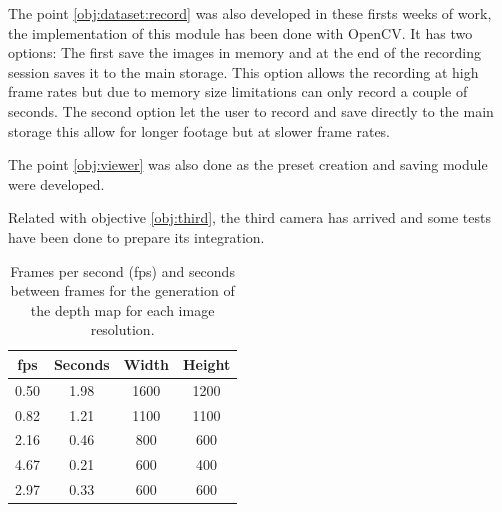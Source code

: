 \documentclass[10pt,a4paper,twocolumn,twoside]{article}
\begin{document}
	The point \ref{obj:dataset:record} was also developed in these firsts weeks of work, the implementation of this module has been done with OpenCV. It has two options:
	The first save the images in memory and at the end of the recording session saves it to the main storage. This option allows the recording at high frame rates but due to memory size limitations can only record a couple of seconds. 
	The second option let the user to record and save directly to the main storage this allow for longer footage but at slower frame rates.
	
	The point \ref{obj:viewer} was also done as the preset creation and saving module were developed.
	
	Related with objective \ref{obj:third}, the third camera has arrived and some tests have been done to prepare its integration.
	
	\begin{table}
		\begin{center}
			\begin{tabular}{cccc}
				\toprule
				fps & Seconds & Width & Height \\ 
				\midrule
				0.50 & 1.98 & 1600 & 1200 \\ 
				
				0.82 & 1.21 & 1100 & 1100 \\ 
				
				2.16 & 0.46 & 800 & 600 \\ 
				
				4.67 & 0.21 & 600 & 400 \\ 
				
				2.97 & 0.33 & 600 & 600 \\ 
				\bottomrule
				
			\end{tabular} 
			\caption{Frames per second (fps) and seconds between frames for the generation of the depth map for each image resolution.}
			\label{tab:depthmap}
		\end{center}
	\end{table}
\end{document}
